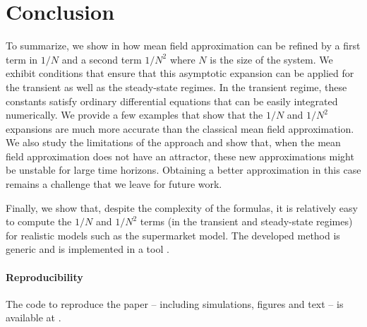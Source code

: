 \documentclass{sig-alternate-per-Performance2018}
\begin{document}
\section{Conclusion}

To summarize, we show in \cite{githubPaper2018} how mean field
approximation can be refined by a first term in $1/N$ and a second
term $1/N^2$ where $N$ is the size of the system. We exhibit
conditions that ensure that this asymptotic expansion can be applied
for the transient as well as the steady-state regimes. In the
transient regime, these constants satisfy ordinary differential
equations that can be easily integrated numerically.  We provide a few
examples that show that the $1/N$ and $1/N^2$ expansions are much more
accurate than the classical mean field approximation.  We also study
the limitations of the approach and show that, when the mean field
approximation does not have an attractor, these new approximations
might be unstable for large time horizons.  Obtaining a better
approximation in this case remains a challenge that we leave for
future work.

Finally, we show that, despite the complexity of the formulas, it is
relatively easy to compute the $1/N$ and $1/N^2$ terms (in the
transient and steady-state regimes) for realistic models such as the
supermarket model. The developed method is generic and is implemented
in a tool \cite{rmfTool2018}.



\paragraph*{Reproducibility} The code to reproduce the paper --
including simulations, figures and text -- is available at
\cite{githubPaper2018}.


\small 




\end{document}
